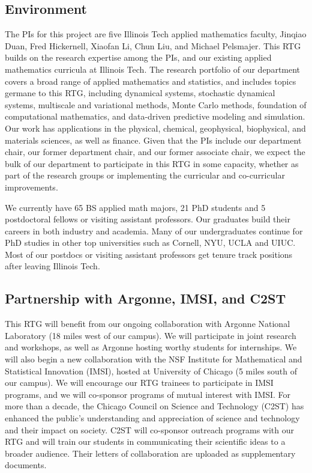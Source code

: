 \documentclass[11pt]{NSFamsart}
\newcommand{\numUG}{65\xspace}
\newcommand{\numPhD}{21\xspace}
\newcommand{\numPostDoc}{5 \xspace}
\begin{document}
\subsection*{Environment} The PIs for this project are five Illinois Tech applied mathematics faculty,  Jinqiao Duan, Fred Hickernell, Xiaofan Li, Chun Liu, and Michael Pelsmajer. This RTG builds on the research expertise among the PIs, and our existing applied mathematics curricula at Illinois Tech.  The research portfolio of our department covers a broad range of applied mathematics and statistics, and includes topics germane to this RTG, including dynamical systems, stochastic dynamical systems, multiscale and variational methods,  Monte Carlo methods, foundation of computational mathematics, and data-driven predictive modeling and simulation. Our work has applications in the physical, chemical, geophysical, biophysical, and materials sciences, as well as finance.  Given that the PIs include our department chair, our former department chair, and our former associate chair, we expect  the bulk of our department to participate in this RTG in some capacity, whether as part of the research groups or implementing the curricular and co-curricular improvements.

We currently have   \numUG BS applied math majors,   \numPhD PhD students and   \numPostDoc postdoctoral fellows or visiting assistant professors. Our graduates build their careers in  both industry  and academia. Many of our undergraduates continue  for PhD studies in other top universities such as Cornell, NYU, UCLA and UIUC. Most of our postdocs or visiting assistant professors get tenure track positions after leaving Illinois Tech.



\subsection*{Partnership with Argonne, IMSI, and C2ST}
This RTG will benefit from our ongoing collaboration with Argonne National Laboratory (18 miles west of our campus). We will participate in joint research and workshops, as well as Argonne hosting worthy students for internships.  We will also begin a new collaboration with the NSF Institute for Mathematical and Statistical Innovation (IMSI), hosted at University of Chicago (5 miles south of our campus). We will encourage our RTG trainees to participate in IMSI programs, and we will co-sponsor programs of mutual interest with IMSI.  For more than a decade, the Chicago Council on Science and Technology (C2ST) has enhanced the public’s understanding and appreciation of science and technology and their impact on society. C2ST will co-sponsor outreach programs with our RTG and will train our students in communicating their scientific ideas to a broader audience. Their letters of collaboration are uploaded as supplementary documents.
 
\end{document}
